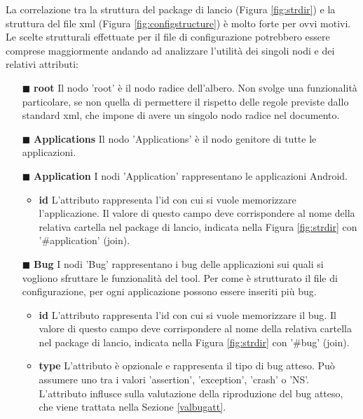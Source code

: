 \noindent La correlazione tra la struttura del package di lancio (Figura \ref{fig:strdir}) e la struttura del file xml (Figura \ref{fig:configstructure}) è molto forte per ovvi motivi. Le scelte strutturali effettuate per il file di configurazione potrebbero essere comprese maggiormente andando ad analizzare l'utilità dei singoli nodi e dei relativi attributi:
 \begin{itemize} [nosep]	
		\item[$\blacksquare$] \textbf{root}  \newline
		Il nodo 'root' è il nodo radice dell'albero. Non svolge una funzionalità particolare, se non quella di permettere il rispetto delle regole previste dallo standard xml, che impone di avere un singolo nodo radice nel documento. 
		\item[$\blacksquare$] \textbf{Applications}  \newline
		Il nodo 'Applications' è il nodo genitore di tutte le applicazioni. 
			\item[$\blacksquare$] \textbf{Application}  \newline
		I nodi 'Application' rappresentano le applicazioni Android. 
		 \begin{itemize} [nosep]	
		\item \textbf{id} L'attributo rappresenta l'id con cui si vuole memorizzare l'applicazione. Il valore di questo campo deve corrispondere al nome della relativa cartella nel package di lancio, indicata nella Figura \ref{fig:strdir} con '\#application'  (join).
		\end{itemize}
		\item[$\blacksquare$] \textbf{Bug}  \newline
		I nodi 'Bug' rappresentano i bug delle applicazioni  sui  quali si vogliono sfruttare le funzionalità del tool. Per come è strutturato il file di configurazione, per ogni applicazione possono essere inseriti più bug.
		 \begin{itemize} [nosep]	
		\item \textbf{id} L'attributo rappresenta l'id con cui si vuole memorizzare il bug. Il valore di questo campo deve corrispondere al nome della relativa cartella nel package di lancio, indicata nella Figura \ref{fig:strdir} con '\#bug' (join).
			\item \textbf{type} L'attributo è opzionale e rappresenta il tipo di bug atteso. Può assumere uno tra i valori 'assertion', 'exception', 'crash' o  'NS'. L'attributo influsce sulla valutazione della riproduzione del bug atteso, che viene trattata nella Sezione \ref{valbugatt}.

\end{itemize}
\end{itemize}
